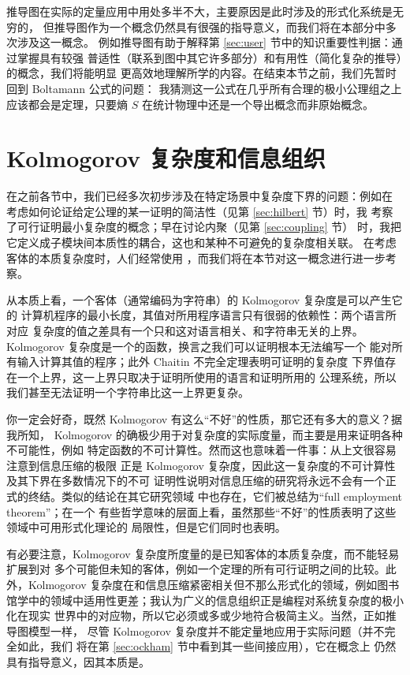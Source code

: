 推导图在实际的定量应用中用处多半不大，主要原因是此时涉及的形式化系统是无穷的，
但推导图作为一个概念仍然具有很强的指导意义，而我们将在本部分中多次涉及这一概念。
例如推导图有助于解释第 \ref{sec:user} 节中的知识重要性判据：通过掌握具有较强
普适性（联系到图中其它许多部分）和有用性（简化复杂的推导）的概念，我们将能明显
更高效地理解所学的内容。在结束本节之前，我们先暂时回到 Boltamann 公式的问题：
我猜测这一公式在几乎所有合理的极小公理组之上应该都会是定理，只要熵 $S$
在统计物理中还是一个导出概念而非原始概念。

\section{Kolmogorov 复杂度和信息组织}\label{sec:kolmogorov}

在之前各节中，我们已经多次初步涉及在特定场景中复杂度下界的问题：例如在
考虑如何论证给定公理的某一证明的简洁性（见第 \ref{sec:hilbert} 节）时，我
考察了可行证明最小复杂度的概念；早在讨论内聚（见第 \ref{sec:coupling} 节）
时，我把它定义成子模块间本质性的耦合，这也和某种不可避免的复杂度相关联。
在考虑客体的本质复杂度时，人们经常使用 %
，而我们将在本节对这一概念进行进一步考察。

从本质上看，一个客体（通常编码为字符串）的 Kolmogorov 复杂度是可以产生它的
计算机程序的最小长度，其值对所用程序语言只有很弱的依赖性：两个语言所对应
复杂度的值之差具有一个只和这对语言相关、和字符串无关的上界。Kolmogorov
复杂度是一个的函数，换言之我们可以证明根本无法编写一个
能对所有输入计算其值的程序；此外 Chaitin 不完全定理表明可证明的复杂度
下界值存在一个上界，这一上界只取决于证明所使用的语言和证明所用的
公理系统，所以我们甚至无法证明一个字符串比这一上界更复杂。

你一定会好奇，既然 Kolmogorov 有这么“不好”的性质，那它还有多大的意义？据我所知，
Kolmogorov 的确极少用于对复杂度的实际度量，而主要是用来证明各种不可能性，例如
特定函数的不可计算性。然而这也意味着一件事：从上文很容易注意到信息压缩的极限
正是 Kolmogorov 复杂度，因此这一复杂度的不可计算性及其下界在多数情况下的不可
证明性说明对信息压缩的研究将永远不会有一个正式的终结。类似的结论在其它研究领域
中也存在，它们被总结为“full employment theorem”；在一个
有些哲学意味的层面上看，虽然那些“不好”的性质表明了这些领域中可用形式化理论的
局限性，但是它们同时也表明。

有必要注意，Kolmogorov 复杂度所度量的是已知客体的本质复杂度，而不能轻易扩展到对
多个可能但未知的客体，例如一个定理的所有可行证明之间的比较。此外，Kolmogorov
复杂度在和信息压缩紧密相关但不那么形式化的领域，例如图书馆学中的领域中适用性更差；我认为广义的信息组织正是编程对系统复杂度的极小化在现实
世界中的对应物，所以它必须或多或少地符合极简主义。当然，正如推导图模型一样，
尽管 Kolmogorov 复杂度并不能定量地应用于实际问题（并不完全如此，我们
将在第 \ref{sec:ockham} 节中看到其一些间接应用），它在概念上
仍然具有指导意义，因其本质是。

